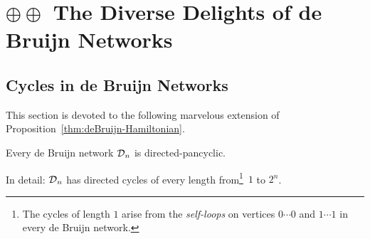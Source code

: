 \chapter{$\oplus \oplus$ The Diverse Delights of de Bruijn Networks}
\label{ch:de-Bruijn-delights}

\section{Cycles in de Bruijn Networks}
\label{Appendix:deBruijn-Pancyclic}

This section is devoted to the following marvelous extension of Proposition~\ref{thm:deBruijn-Hamiltonian}.


\begin{prop}
\label{thm:deBruijn-pancyclic}
Every de Bruijn network $\mbox{$\cal D$}_n$ is directed-pancyclic.

\smallskip

\noindent
In detail:  $\mbox{$\cal D$}_n$ has directed cycles of every length from\footnote{The cycles of length $1$ arise from the {\it self-loops} on vertices $0 \cdots 0$ and $1 \cdots 1$ in every de Bruijn network.}~$1$ to $2^n$.
\end{prop}

